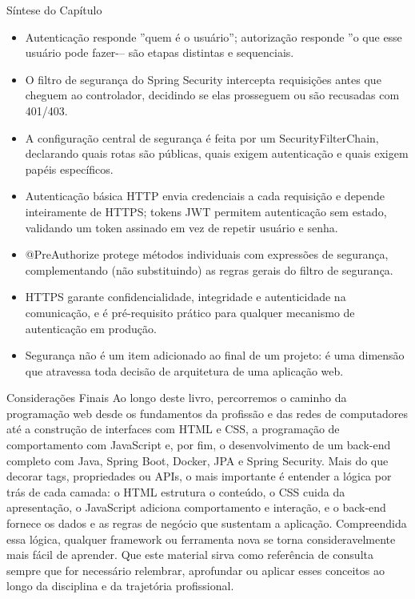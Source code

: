 Síntese do Capítulo

\begin{itemize}
  \item Autenticação responde ”quem é o usuário”; autorização responde ”o que esse usuário pode fazer-– são etapas distintas e sequenciais.
  \item O filtro de segurança do Spring Security intercepta requisições antes que cheguem ao controlador, decidindo se elas prosseguem ou são recusadas com 401/403.
  \item A configuração central de segurança é feita por um SecurityFilterChain, declarando quais rotas são públicas, quais exigem autenticação e quais exigem papéis específicos.
  \item Autenticação básica HTTP envia credenciais a cada requisição e depende inteiramente de HTTPS; tokens JWT permitem autenticação sem estado, validando um token assinado em vez de repetir usuário e senha.
  \item @PreAuthorize protege métodos individuais com expressões de segurança, complementando (não substituindo) as regras gerais do filtro de segurança.
\end{itemize}

\begin{itemize}
  \item HTTPS garante confidencialidade, integridade e autenticidade na comunicação, e é pré-requisito prático para qualquer mecanismo de autenticação em produção.
\end{itemize}

\begin{itemize}
  \item Segurança não é um item adicionado ao final de um projeto: é uma dimensão que atravessa toda decisão de arquitetura de uma aplicação web.
\end{itemize}

Considerações Finais Ao longo deste livro, percorremos o caminho da programação web desde os fundamentos da profissão e das redes de computadores até a construção de interfaces com HTML e CSS, a programação de comportamento com JavaScript e, por fim, o desenvolvimento de um back-end completo com Java, Spring Boot, Docker, JPA e Spring Security. Mais do que decorar tags, propriedades ou APIs, o mais importante é entender a lógica por trás de cada camada: o HTML estrutura o conteúdo, o CSS cuida da apresentação, o JavaScript adiciona comportamento e interação, e o back-end fornece os dados e as regras de negócio que sustentam a aplicação. Compreendida essa lógica, qualquer framework ou ferramenta nova se torna consideravelmente mais fácil de aprender. Que este material sirva como referência de consulta sempre que for necessário relembrar, aprofundar ou aplicar esses conceitos ao longo da disciplina e da trajetória profissional.
